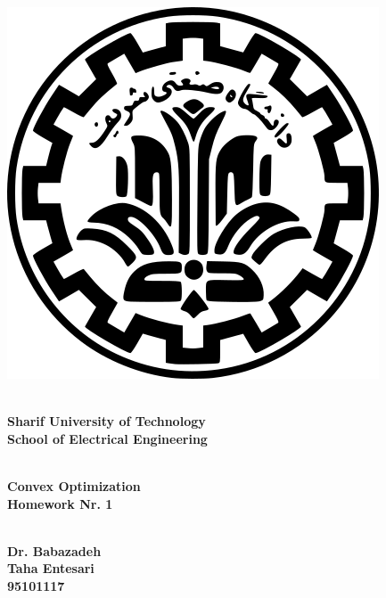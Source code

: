 \documentclass[a4paper]{article}
\begin{document}
\begin{center}
	\vspace{2cm}
	\includegraphics[scale=.35]{logo1.png}\\
	\vspace{0.5cm}
	\begin{Large}
	\textbf{
	\\Sharif University of Technology
	\vspace{0.5cm}
	\\School of Electrical Engineering
	}
	\end{Large}
	\vspace{2cm}
	\begin{huge}
	\textbf{
	\\Convex Optimization
	\vspace{0.75cm}
‍
	\\Homework Nr. 1
	}
	\end{huge}
	\vspace{2cm}
	\begin{Large}
	\textbf{
	\\Dr. Babazadeh
	\vspace{2cm}
	\\Taha Entesari
	\vspace{0.75cm}
	\\95101117
	}
	\end{Large}
	
\end{center}

\thispagestyle{empty}
\newpage
\end{document}
